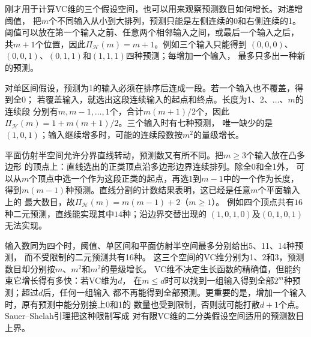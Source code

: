 刚才用于计算VC维的三个假设空间，也可以用来观察预测数目如何增长。对递增阈值，
把$m$个不同输入从小到大排列，预测只能是左侧连续的0和右侧连续的1。
阈值可以放在第一个输入之前、任意两个相邻输入之间，或最后一个输入之后，
共$m+1$个位置，因此$\Pi_{\mathcal H}(m)=m+1$。例如三个输入只能得到
$(0,0,0)$、$(0,0,1)$、$(0,1,1)$和$(1,1,1)$四种预测；每增加一个输入，
最多只多出一种新的预测。

对单区间假设，预测为1的输入必须在排序后连成一段。若一个输入也不覆盖，得到全0；
若覆盖输入，就选出这段连续输入的起点和终点。长度为1、2、$\ldots$、$m$的连续段
分别有$m,m-1,\ldots,1$个，合计$m(m+1)/2$个，因此
$\Pi_{\mathcal H}(m)=1+m(m+1)/2$。三个输入时有七种预测，
唯一缺少的是$(1,0,1)$；输入继续增多时，可能的连续段数按$m^2$的量级增长。

平面仿射半空间允许分界直线转动，预测数又有所不同。把$m\geq3$个输入放在凸多边形
的顶点上：直线选出的正类顶点沿多边形边界连续排列。除全0和全1外，
可以从$m$个顶点中选一个作为这段正类的起点，再选$1$到$m-1$中的一个作为长度，
得到$m(m-1)$种预测。直线分割的计数结果表明，这已经是任意$m$个平面输入上的
最大数目，故$\Pi_{\mathcal H}(m)=m(m-1)+2$（$m\geq1$）。
例如四个顶点共有$16$种二元预测，直线能实现其中$14$种；沿边界交替出现的
$(1,0,1,0)$及$(0,1,0,1)$无法实现。

输入数同为四个时，阈值、单区间和平面仿射半空间最多分别给出5、11、14种预测，
而不受限制的二元预测共有16种。
这三个空间的VC维分别为1、2和3，预测数目却分别按$m$、$m^2$和$m^2$的量级增长。
VC维不决定生长函数的精确值，但能约束它增长得有多快：若VC维为$d$，
在$m\leq d$时可以找到一组输入得到全部$2^m$种预测；超过$d$后，任何一组输入
都不再能得到全部预测。更重要的是，增加一个输入时，原有预测中能分别接上0和1的
数量也受到限制，否则就可能打散$d+1$个点。Sauer--Shelah引理把这种限制写成
对有限VC维的二分类假设空间适用的预测数目上界。

